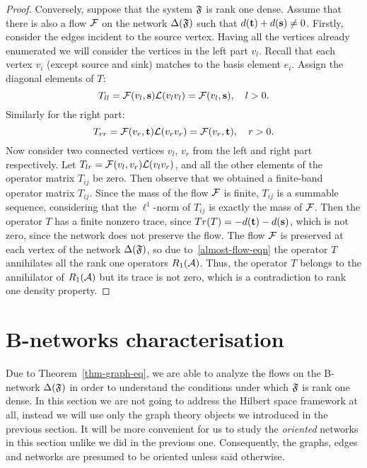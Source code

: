 \documentclass[12pt,oneside,a4paper]{amsart}
\begin{document}
\begin{proof}
        Conversely, suppose that the system $\fsys$ is rank one dense.
        Assume that there is also a flow $\flow$ on the network $\net(\fsys)$ such that $d(\sink) + d(\source) \neq 0$.
        Firstly, consider the edges incident to the source vertex.
        Having all the vertices already enumerated we will consider the vertices in the left part $v_{l}$.
        Recall that each vertex $v_i$ (except source and sink) matches to the basis element $e_i$.
        Assign the diagonal elements of $T$:
        \[
          T_{ll} = \flow(v_l, \source) \len(v_l v_l) = \flow(v_l, \source), \quad l > 0.
        \]
        Similarly for the right part:
        \[
          T_{rr} = \flow(v_r, \sink) \len(v_r v_r) = \flow(v_r, \sink), \quad r > 0.
        \]
        Now consider two connected vertices $v_l$, $v_r$ from the left and right part respectively.
        Let $T_{lr} = \flow(v_l, v_r) \len(v_l  v_r)$,
        and all the other elements of the operator matrix $T_{ij}$ be zero.
        Then observe that we obtained a finite-band operator matrix $T_{ij}$.
        Since the mass of the flow $\flow$ is finite, $T_{ij}$ is a summable sequence, considering that
          the $\ell^1$-norm of $T_{ij}$ is exactly the mass of $\flow$.
        Then the operator $T$ has a finite nonzero trace, since $Tr(T) = -d(\sink) - d(\source)$, which is not zero,
          since the network does not preserve the flow.
        The flow $\flow$ is preserved at each vertex of the network $\net(\fsys)$, so due to~\eqref{almost-flow-eqn}
          the operator $T$ annihilates all the rank one operators $R_1(\cal{A})$.
        Thus, the operator $T$ belongs to the annihilator of $R_1(\cal{A})$ but its trace is not zero,
          which is a contradiction to rank one density property.
      \end{proof}

  \bigskip
  \section{B-networks characterisation}
    \label{sec:char}
    Due to Theorem~\ref{thm-graph-eq}, we are able to analyze the flows on the B-network
      $\net(\fsys)$ in order to understand the conditions under which $\fsys$ is rank one dense.
    In this section we are not going to address the Hilbert space framework at all,
      instead we will use only the graph theory objects we introduced in the previous section.
    It will be more convenient for us to study the \emph{oriented} networks in this section unlike we
      did in the previous one.
    Consequently, the graphs, edges and networks are presumed to be oriented unless said otherwise.
\end{document}

